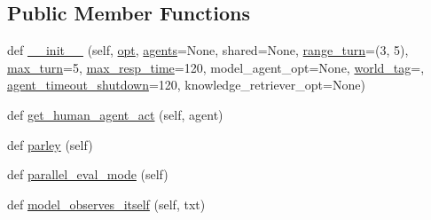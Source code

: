\subsection*{Public Member Functions}
\begin{DoxyCompactItemize}
\item 
def \hyperlink{classprojects_1_1wizard__of__wikipedia_1_1mturk__evaluation__task_1_1worlds_1_1WizardEval_ac1e77202cbc7aa82ec603df4aaaffaf7}{\+\_\+\+\_\+init\+\_\+\+\_\+} (self, \hyperlink{classprojects_1_1wizard__of__wikipedia_1_1mturk__evaluation__task_1_1worlds_1_1WizardEval_a793bf2d1056a9f3e70c89f43062d8db2}{opt}, \hyperlink{classparlai_1_1core_1_1worlds_1_1MultiAgentDialogWorld_a05fc93525cb86edef121980fc55f9926}{agents}=None, shared=None, \hyperlink{classprojects_1_1wizard__of__wikipedia_1_1mturk__evaluation__task_1_1worlds_1_1WizardEval_aa245724e16215bb2739524d94cee6582}{range\+\_\+turn}=(3, 5), \hyperlink{classprojects_1_1wizard__of__wikipedia_1_1mturk__evaluation__task_1_1worlds_1_1WizardEval_a56e2813e954250d045d519297a9469e3}{max\+\_\+turn}=5, \hyperlink{classprojects_1_1wizard__of__wikipedia_1_1mturk__evaluation__task_1_1worlds_1_1WizardEval_acf3ad9fdd1d432a9a520ea8bce150f4f}{max\+\_\+resp\+\_\+time}=120, model\+\_\+agent\+\_\+opt=None, \hyperlink{classprojects_1_1wizard__of__wikipedia_1_1mturk__evaluation__task_1_1worlds_1_1WizardEval_a704cab2652de8aba49350f041d249804}{world\+\_\+tag}=\textquotesingle{}\textquotesingle{}, \hyperlink{classprojects_1_1wizard__of__wikipedia_1_1mturk__evaluation__task_1_1worlds_1_1WizardEval_aef19629b948f594f5db8b97a0a482c00}{agent\+\_\+timeout\+\_\+shutdown}=120, knowledge\+\_\+retriever\+\_\+opt=None)
\item 
def \hyperlink{classprojects_1_1wizard__of__wikipedia_1_1mturk__evaluation__task_1_1worlds_1_1WizardEval_abc7bd5ac461df6eaf0e591888aaf68b9}{get\+\_\+human\+\_\+agent\+\_\+act} (self, agent)
\item 
def \hyperlink{classprojects_1_1wizard__of__wikipedia_1_1mturk__evaluation__task_1_1worlds_1_1WizardEval_abfff1c20503e898e721969580c160f67}{parley} (self)
\item 
def \hyperlink{classprojects_1_1wizard__of__wikipedia_1_1mturk__evaluation__task_1_1worlds_1_1WizardEval_a1cffb86be3a550ac33519b487959ec8c}{parallel\+\_\+eval\+\_\+mode} (self)
\item 
def \hyperlink{classprojects_1_1wizard__of__wikipedia_1_1mturk__evaluation__task_1_1worlds_1_1WizardEval_a57f678d93fee85fb988fce00c22560d5}{model\+\_\+observes\+\_\+itself} (self, txt)
\item 

\end{DoxyCompactItemize}
